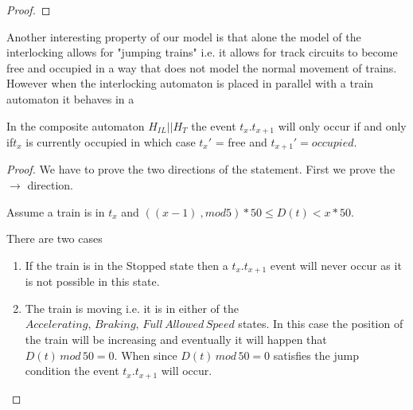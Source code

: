 \begin{mytheorem}
\begin{proof}

\end{proof}

\end{mytheorem}


Another interesting property of our model is that alone the model of the interlocking allows for "jumping trains" i.e. it allows for track circuits to become free and occupied in a way that does not model the normal movement of trains.
However when the interlocking automaton is placed in parallel with a train automaton it behaves in a

\begin{mytheorem}

In the composite automaton $H_{IL}|| H_{T} $  the event $t_x.t_{x+1}$ will only occur if  and only if$t_x$ is currently occupied in which case $t_x'$ = free and $t_{x+1}' = occupied$.


\begin{proof}
We have to prove the two directions of the statement. First we prove the $\to$ direction.




Assume a train is in $t_x$ and $((x-1) \ ,mod 5) * 50 \leq D(t) < x *50$.

There are two cases
\begin{enumerate}
\item If the train is in the Stopped state then a $t_{x}.t_{x+1}$ event will never occur as it is not possible in this state.

\item The train is moving i.e. it is in either of the $Accelerating, \, Braking , \,  Full \, Allowed \, Speed$ states. In this case the position of the train will be increasing and eventually it will happen that $D(t) \,  mod \, 50 = 0$. When since $D(t) \, mod \, 50 = 0$  satisfies the jump condition the event
 $t_{x}.t_{x+ 1}$ will occur.  
 

\end{enumerate}
\end{proof}
\end{mytheorem}


